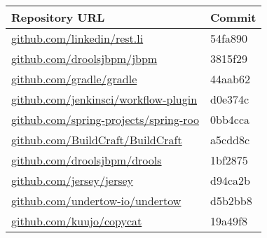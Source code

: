 \begin{tabular}{@{}ll@{}}
\toprule
Repository URL & Commit \\
\midrule
\small\url{github.com/linkedin/rest.li}   & 54fa890\\
\small\url{github.com/droolsjbpm/jbpm}    & 3815f29\\
\small\url{github.com/gradle/gradle}  & 44aab62\\
\small\url{github.com/jenkinsci/workflow-plugin}  & d0e374c\\
\small\url{github.com/spring-projects/spring-roo} & 0bb4cca\\
\small\url{github.com/BuildCraft/BuildCraft}  & a5cdd8c\\
\small\url{github.com/droolsjbpm/drools}  & 1bf2875\\
\small\url{github.com/jersey/jersey}  & d94ca2b\\
\small\url{github.com/undertow-io/undertow}   & d5b2bb8\\
\small\url{github.com/kuujo/copycat}  & 19a49f8\\
\bottomrule
\end{tabular}
